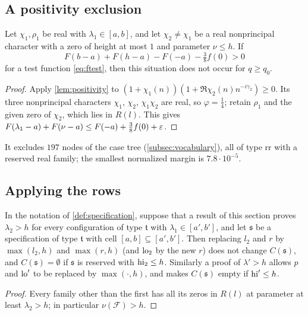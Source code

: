 \subsection{A positivity exclusion}

\begin{proposition}\label{prop:positivity}
Let $\chi_1,\rho_1$ be real with $\lambda_1\in[a,b]$, and let $\chi_2\ne\chi_1$ be a real nonprincipal
character with a zero of height at most $1$ and parameter $\nu\le h$. If
\[
  F(b-a)+F(h-a)-F(-a)-\tfrac38f(0)>0
\]
for a test function \eqref{eq:ftest}, then this situation does not occur for $q\ge q_0$.
\end{proposition}

\begin{proof}
Apply \cref{lem:positivity} to $(1+\chi_1(n))(1+\Re\chi_2(n)n^{-i\gamma_2})\ge0$. Its three nonprincipal
characters $\chi_1$, $\chi_2$, $\chi_1\chi_2$ are real, so $\varphi=\frac14$; retain $\rho_1$ and the given zero of
$\chi_2$, which lies in $R(l)$. This gives $F(\lambda_1-a)+F(\nu-a)\le F(-a)+\frac38f(0)+\varepsilon$.
\end{proof}

It excludes $197$ nodes of the case tree (\cref{subsec:vocabulary}), all of type $\mathrm{rr}$ with
a reserved real family; the smallest normalized margin is $7.8\cdot10^{-5}$.

\subsection{Applying the rows}

\begin{lemma}\label{lem:updates}
In the notation of \cref{def:specification}, suppose that a result of this section proves $\lambda_2>h$ for every configuration of type $\mathfrak t$ with
$\lambda_1\in[a',b']$, and let $\mathfrak s$ be a specification of type $\mathfrak t$ with cell $[a,b]\subseteq[a',b']$.
Then replacing $l_2$ and $r$ by $\max(l_2,h)$ and $\max(r,h)$ (and $\mathrm{lo}_2$ by the new $r$) does not
change $C(\mathfrak s)$, and $C(\mathfrak s)=\emptyset$ if $\mathfrak s$ is reserved with $\mathrm{hi}_2\le h$. Similarly a proof of
$\lambda'>h$ allows $p$ and $\mathrm{lo}'$ to be replaced by $\max(\cdot,h)$, and makes $C(\mathfrak s)$ empty if
$\mathrm{hi}'\le h$.
\end{lemma}

\begin{proof}
Every family other than the first has all its zeros in $R(l)$ at parameter at least $\lambda_2>h$; in
particular $\nu(\mathcal F)>h$.
\end{proof}

